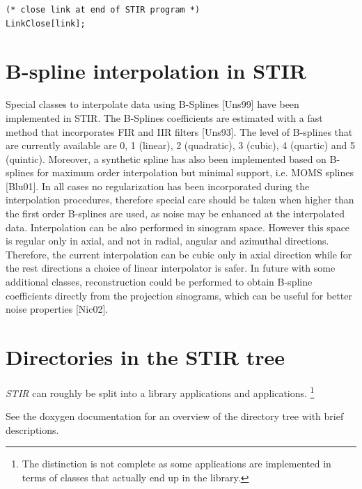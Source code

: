 \documentclass{article}
\begin{document}
{{{{{{\begin{verbatim}
(* close link at end of STIR program *)
LinkClose[link];
\end{verbatim}


\section{B-spline interpolation in STIR}

\label{sec:BSplines}
Special classes to interpolate data using B-Splines [Uns99] have been implemented in STIR. 
The B-Splines coefficients are estimated with a fast method that incorporates FIR and IIR 
filters [Uns93]. The level of B-splines that are currently available are 0, 1 (linear), 
2 (quadratic), 3 (cubic), 4 (quartic) and 5 (quintic). Moreover, a synthetic spline has also been 
implemented based on B-splines for maximum order interpolation but minimal support, i.e. MOMS 
splines [Blu01]. In all cases no regularization has been incorporated during the interpolation 
procedures, therefore special care should be taken when higher than the first order B-splines 
are used, as noise may be enhanced at the interpolated data. Interpolation can be also performed 
in sinogram space. However this space is regular only in axial, and not in radial, angular and 
azimuthal directions. Therefore, the current interpolation can be cubic only in axial direction 
while for the rest directions a choice of linear interpolator is safer. In future with some 
additional classes, reconstruction could be performed to obtain B-spline coefficients directly 
from the projection sinograms, which can be useful for better noise properties [Nic02].

\section{
Directories in the STIR tree}
\textit{STIR} can roughly be split into a library applications and applications.
\footnote{The distinction is not complete as some applications are implemented
in terms of classes that actually end up in the library.}

See the doxygen documentation for an overview of the directory tree with brief descriptions.

}}}}}}
\end{document}
